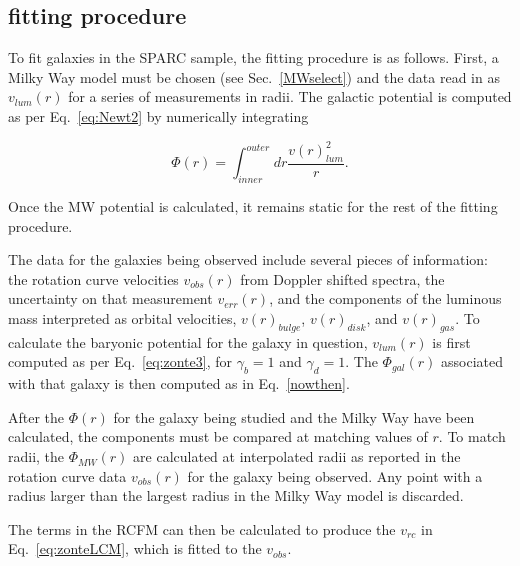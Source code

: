 \documentclass[reprint,%
 amsmath,amssymb,
 aps,
]{revtex4-1}
\begin{document}
 

 
 
 




\subsection{fitting procedure}



To fit galaxies in the SPARC sample,  the fitting procedure is as follows.   First,  a       Milky Way model must be chosen (see Sec.~\ref{MWselect})  and the data  read in as $v_{lum}(r)$ for a series of measurements in radii. The galactic potential is computed as per Eq.~\ref{eq:Newt2} by numerically integrating

\begin{equation}
\Phi(r) = \int_{inner}^{outer} dr \frac{ 
v(r)^2_{lum} 
}{r}.
\label{nowthen}
\end{equation}

Once the MW potential is calculated, it remains static for the rest of the fitting procedure.  

The data for the   galaxies being observed include several pieces of information: the rotation curve velocities $v_{obs}(r)$ from Doppler shifted spectra, the uncertainty on that measurement $v_{err}(r)$, and the components of the luminous mass interpreted as orbital velocities,  $v(r)_{bulge}$, $v(r)_{disk}$, and $v(r)_{gas}$. 
To calculate the baryonic potential for the galaxy in question, $v_{lum}(r)$ is first computed   as per Eq.~\ref{eq:zonte3}, for $\gamma_b=1$ and $\gamma_d=1$. The $\Phi_{gal}(r)$ associated with that galaxy   is then computed as in Eq.~\ref{nowthen}.

After the $\Phi(r)$ for the galaxy being studied and the Milky Way have been calculated,   the components must be compared at  matching values of $r$. To match radii, the $\Phi_{MW}(r)$ are calculated at  interpolated   radii as reported in the 
rotation curve data $v_{obs}(r)$ for the galaxy being observed. Any point with a radius larger than the largest radius in the Milky Way model is discarded.

The terms in the RCFM   can then be calculated  to produce the  $v_{rc}$ in Eq.~\ref{eq:zonteLCM}, which is  fitted to the  $v_{obs}$. 
\end{document}
